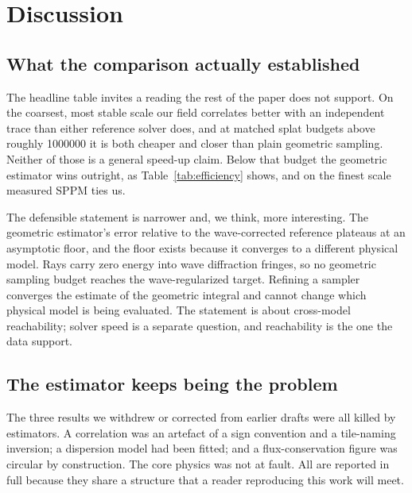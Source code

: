 \section{Discussion}
\label{sec:discussion}

\subsection{What the comparison actually established}
\label{sec:disc-what}

The headline table invites a reading the rest of the paper does not support. On
the coarsest, most stable scale our field correlates better with an independent
trace than either reference solver does, and at matched splat budgets above
roughly \num{1000000} it is both cheaper and closer than plain geometric
sampling. Neither of those is a general speed-up claim. Below that budget the
geometric estimator wins outright, as
Table~\ref{tab:efficiency} shows, and on the finest scale measured SPPM ties us.

The defensible statement is narrower and, we think, more interesting. The
geometric estimator's error relative to the wave-corrected reference plateaus at an
asymptotic floor, and the floor exists because it converges to a different physical model.
Rays carry zero energy into wave diffraction fringes, so no geometric sampling budget
reaches the wave-regularized target. Refining a sampler converges the estimate of the
geometric integral and cannot change which physical model is being evaluated.
The statement is about cross-model reachability; solver speed is a separate question, and reachability is the one the data support.

\subsection{The estimator keeps being the problem}
\label{sec:disc-estimator}

The three results we withdrew or corrected from earlier drafts were all killed by estimators. A correlation was an artefact of a sign convention and a tile-naming inversion; a dispersion model had been fitted; and a flux-conservation figure was circular by construction. The core physics was not at fault.
All are reported in full because they share a structure that a reader
reproducing this work will meet.

